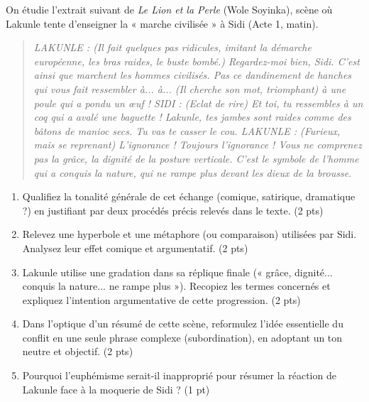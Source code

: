 \documentclass[11pt]{article}
\begin{document}
\begin{exercice}
\label{exo:lion}
On étudie l'extrait suivant de \textit{Le Lion et la Perle} (Wole Soyinka), scène où Lakunle tente d'enseigner la « marche civilisée » à Sidi (Acte 1, matin).

\begin{quote}
\textit{LAKUNLE : (Il fait quelques pas ridicules, imitant la démarche européenne, les bras raides, le buste bombé.) Regardez-moi bien, Sidi. C'est ainsi que marchent les hommes civilisés. Pas ce dandinement de hanches qui vous fait ressembler à... à... (Il cherche son mot, triomphant) à une poule qui a pondu un œuf !
SIDI : (Eclat de rire) Et toi, tu ressembles à un coq qui a avalé une baguette ! Lakunle, tes jambes sont raides comme des bâtons de manioc secs. Tu vas te casser le cou.
LAKUNLE : (Furieux, mais se reprenant) L'ignorance ! Toujours l'ignorance ! Vous ne comprenez pas la grâce, la dignité de la posture verticale. C'est le symbole de l'homme qui a conquis la nature, qui ne rampe plus devant les dieux de la brousse.}
\end{quote}

\begin{enumerate}
    \item Qualifiez la tonalité générale de cet échange (comique, satirique, dramatique ?) en justifiant par deux procédés précis relevés dans le texte. \hfill (2 pts)
    \item Relevez une hyperbole et une métaphore (ou comparaison) utilisées par Sidi. Analysez leur effet comique et argumentatif. \hfill (2 pts)
    \item Lakunle utilise une gradation dans sa réplique finale (« grâce, dignité... conquis la nature... ne rampe plus »). Recopiez les termes concernés et expliquez l'intention argumentative de cette progression. \hfill (2 pts)
    \item Dans l'optique d'un résumé de cette scène, reformulez l'idée essentielle du conflit en une seule phrase complexe (subordination), en adoptant un ton neutre et objectif. \hfill (2 pts)
    \item Pourquoi l'euphémisme serait-il inapproprié pour résumer la réaction de Lakunle face à la moquerie de Sidi ? \hfill (1 pt)
\end{enumerate}
\end{exercice}
\end{document}
